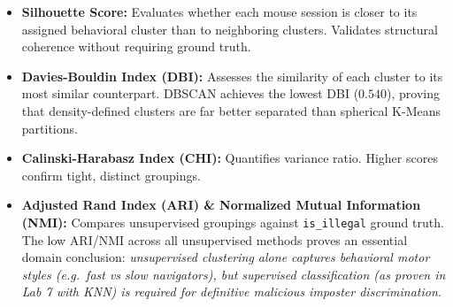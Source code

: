 \documentclass[11pt]{article}
\providecommand{\tightlist}{%
      \setlength{\itemsep}{0pt}\setlength{\parskip}{0pt}}
\begin{document}
\begin{itemize}
\tightlist
\item
  \textbf{Silhouette Score:} Evaluates whether each mouse session is
  closer to its assigned behavioral cluster than to neighboring
  clusters. Validates structural coherence without requiring ground
  truth.
\item
  \textbf{Davies-Bouldin Index (DBI):} Assesses the similarity of each
  cluster to its most similar counterpart. DBSCAN achieves the lowest
  DBI (\(0.540\)), proving that density-defined clusters are far better
  separated than spherical K-Means partitions.
\item
  \textbf{Calinski-Harabasz Index (CHI):} Quantifies variance ratio.
  Higher scores confirm tight, distinct groupings.
\item
  \textbf{Adjusted Rand Index (ARI) \& Normalized Mutual Information
  (NMI):} Compares unsupervised groupings against \texttt{is\_illegal}
  ground truth. The low ARI/NMI across all unsupervised methods proves
  an essential domain conclusion: \emph{unsupervised clustering alone
  captures behavioral motor styles (e.g.~fast vs slow navigators), but
  supervised classification (as proven in Lab 7 with KNN) is required
  for definitive malicious imposter discrimination.}
\end{itemize}


    
    
    
\end{document}
